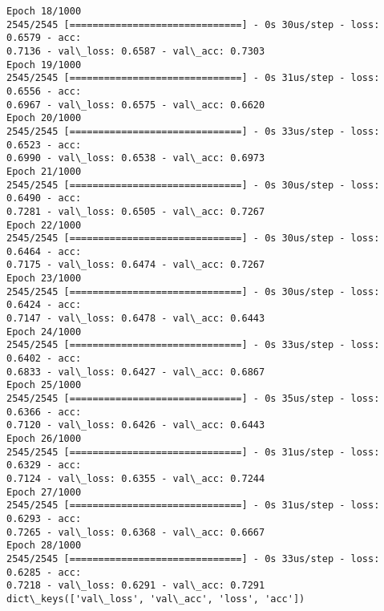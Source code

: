 \documentclass[11pt]{article}
\begin{document}
\begin{Verbatim}[commandchars=\\\{\}]
Epoch 18/1000
2545/2545 [==============================] - 0s 30us/step - loss: 0.6579 - acc:
0.7136 - val\_loss: 0.6587 - val\_acc: 0.7303
Epoch 19/1000
2545/2545 [==============================] - 0s 31us/step - loss: 0.6556 - acc:
0.6967 - val\_loss: 0.6575 - val\_acc: 0.6620
Epoch 20/1000
2545/2545 [==============================] - 0s 33us/step - loss: 0.6523 - acc:
0.6990 - val\_loss: 0.6538 - val\_acc: 0.6973
Epoch 21/1000
2545/2545 [==============================] - 0s 30us/step - loss: 0.6490 - acc:
0.7281 - val\_loss: 0.6505 - val\_acc: 0.7267
Epoch 22/1000
2545/2545 [==============================] - 0s 30us/step - loss: 0.6464 - acc:
0.7175 - val\_loss: 0.6474 - val\_acc: 0.7267
Epoch 23/1000
2545/2545 [==============================] - 0s 30us/step - loss: 0.6424 - acc:
0.7147 - val\_loss: 0.6478 - val\_acc: 0.6443
Epoch 24/1000
2545/2545 [==============================] - 0s 33us/step - loss: 0.6402 - acc:
0.6833 - val\_loss: 0.6427 - val\_acc: 0.6867
Epoch 25/1000
2545/2545 [==============================] - 0s 35us/step - loss: 0.6366 - acc:
0.7120 - val\_loss: 0.6426 - val\_acc: 0.6443
Epoch 26/1000
2545/2545 [==============================] - 0s 31us/step - loss: 0.6329 - acc:
0.7124 - val\_loss: 0.6355 - val\_acc: 0.7244
Epoch 27/1000
2545/2545 [==============================] - 0s 31us/step - loss: 0.6293 - acc:
0.7265 - val\_loss: 0.6368 - val\_acc: 0.6667
Epoch 28/1000
2545/2545 [==============================] - 0s 33us/step - loss: 0.6285 - acc:
0.7218 - val\_loss: 0.6291 - val\_acc: 0.7291
dict\_keys(['val\_loss', 'val\_acc', 'loss', 'acc'])
\end{Verbatim}

    \begin{center}
    \end{center}
    { \hspace*{\fill} \\}
    
\end{document}
